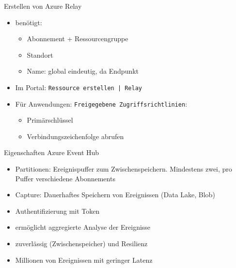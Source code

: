 \begin{flashcard}[Definition]{Erstellen von Azure Relay}
    \begin{itemize}
        \item benötigt:
            \begin{itemize}
                \item Abonnement + Ressourcengruppe
                \item Standort
                \item Name: global eindeutig, da Endpunkt
            \end{itemize}
        \item Im Portal: \texttt{Ressource erstellen | Relay}
        \item Für Anwendungen: \texttt{Freigegebene Zugriffsrichtlinien}:
        \begin{itemize}
            \item Primärschlüssel
            \item Verbindungszeichenfolge abrufen
        \end{itemize}
    \end{itemize}
\end{flashcard}

\begin{flashcard}[Definition]{Eigenschaften Azure Event Hub}
    \begin{itemize}
        \item Partitionen:\newline
            Ereignispuffer zum Zwischenspeichern. Mindestens zwei, pro Puffer verschiedene Abonnements
        \item Capture:\newline
            Dauerhaftes Speichern von Ereignissen (Data Lake, Blob)
        \item Authentifizierung mit Token
        \item ermöglicht aggregierte Analyse der Ereignisse
        \item zuverlässig (Zwischenspeicher) und Resilienz
        \item Millionen von Ereignissen mit geringer Latenz
    \end{itemize}
\end{flashcard}

